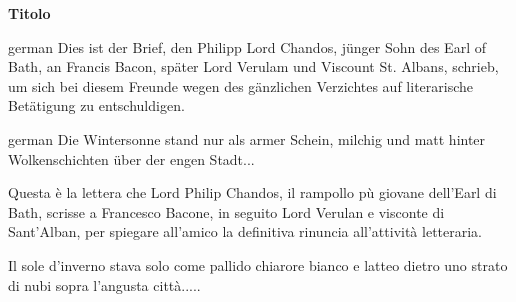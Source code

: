 \documentclass[10pt,b5paper,twoside]{memoir}
\newenvironment{DE}{\begin{otherlanguage*}{german}}{\end{otherlanguage*}}
\begin{document}
\begin{center} 	{\Huge\bfseries{Titolo}} \end{center}	\setlength{\parindent}{0mm}
\begin{pairs}\begin{Leftside}\beginnumbering
\vspace{10mm} 
		
\pstart
\begin{DE}
Dies ist der Brief, den Philipp Lord Chandos, j\"{u}nger Sohn des Earl of Bath, an Francis Bacon, sp\"{a}ter Lord Verulam und Viscount St. Albans, schrieb, um sich bei diesem Freunde wegen des g\"{a}nzlichen Verzichtes auf literarische Bet\"{a}tigung zu entschuldigen.
\end{DE}
\pend
		
\pstart
\begin{DE}
Die Wintersonne stand nur als armer Schein, milchig und matt hinter Wolkenschichten \"{u}ber der engen Stadt...
\end{DE}
\pend
\endnumbering
\end{Leftside}%
	
\begin{Rightside}
\beginnumbering
\pstart%
Questa è la lettera che Lord Philip Chandos, il rampollo pù giovane dell'Earl di Bath, scrisse a Francesco Bacone, in seguito Lord Verulan e visconte di Sant'Alban, per spiegare all'amico la definitiva rinuncia all'attività letteraria.
\pend
		
\pstart
Il sole d'inverno stava solo come pallido chiarore bianco e latteo dietro uno strato di nubi sopra l'angusta città.....%
\pend%
\endnumbering
\end{Rightside}%
\end{pairs} 
\Columns
\end{document}
